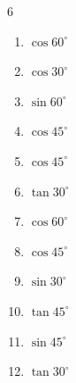 \begin{multicols}{6}
\begin{enumerate}

  \item $\displaystyle \cos{60^\circ}$


  \item $\displaystyle \cos{30^\circ}$


  \item $\displaystyle \sin{60^\circ}$


  \item $\displaystyle \cos{45^\circ}$


  \item $\displaystyle \cos{45^\circ}$


  \item $\displaystyle \tan{30^\circ}$


  \item $\displaystyle \cos{60^\circ}$


  \item $\displaystyle \cos{45^\circ}$


  \item $\displaystyle \sin{30^\circ}$


  \item $\displaystyle \tan{45^\circ}$

        \phantom{$\displaystyle =1$}

  \item $\displaystyle \sin{45^\circ}$


  \item $\displaystyle \tan{30^\circ}$



\end{enumerate}
\end{multicols}
